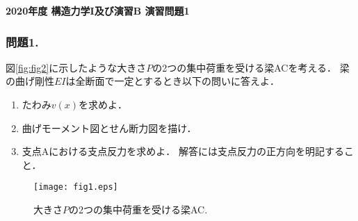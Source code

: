 \documentclass[10pt,a4j]{jarticle}
\newlength{\minitwocolumn}
\begin{document}
\newcommand{\fat}[1]{\mbox{\boldmath $#1$}}
\newcommand{\D}{\partial}
\newcommand{\w}{\omega}
\newcommand{\ga}{\alpha}
\newcommand{\gb}{\beta}
\newcommand{\gx}{\xi}
\newcommand{\gz}{\zeta}
\newcommand{\vhat}[1]{\hat{\fat{#1}}}
\newcommand{\spc}{\vspace{0.7\baselineskip}}
\newcommand{\halfspc}{\vspace{0.3\baselineskip}}

\pagestyle{empty}
\newcommand{\twofig}[2]
 {
   \begin{figure}[h]
     \begin{minipage}[t]{\minitwocolumn}
         \begin{center}   #1
         \end{center}
     \end{minipage}
         \hspace{\columnsep}
     \begin{minipage}[t]{\minitwocolumn}
         \begin{center} #2
         \end{center}
     \end{minipage}
   \end{figure}
 }
\begin{center}
{\Large \bf 2020年度 構造力学I及び演習B 演習問題1} \\
\end{center}
\subsubsection*{問題1. }
図\ref{fig:fig2}に示したような大きさ$P$の2つの集中荷重を受ける梁ACを考える．
梁の曲げ剛性$EI$は全断面で一定とするとき以下の問いに答えよ．
\begin{enumerate}
\item
	たわみ$v(x)$を求めよ．
\item
	曲げモーメント図とせん断力図を描け．
\item
	支点Aにおける支点反力を求めよ．
	解答には支点反力の正方向を明記すること．
\end{enumerate}
\begin{figure}[h]
	\begin{center}
	\texttt{[image: fig1.eps]} 
	\end{center}
	\vspace{-5mm}
	\caption{大きさ$P$の2つの集中荷重を受ける梁AC.}
	\label{fig:fig1}
\end{figure}
\end{document}
